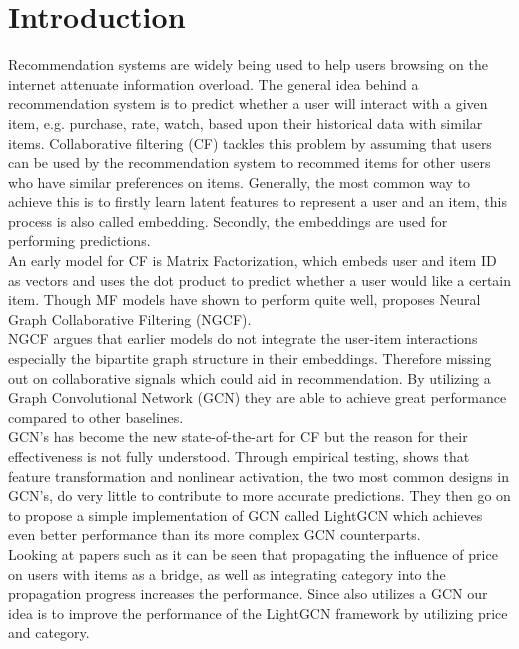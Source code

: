 \section{Introduction}
Recommendation systems are widely being used to help users browsing on the internet attenuate information overload\cite{YT_rec,Pint_rec}.
The general idea behind a recommendation system is to predict whether a user will interact with a given item, e.g. purchase, rate, watch, based upon their historical data with similar items.
Collaborative filtering (CF) tackles this problem by assuming that users can be used by the recommendation system to recommed items for other users who have similar preferences on items.
Generally, the most common way to achieve this is to firstly learn latent features to represent a user and an item, this process is also called embedding.
Secondly, the embeddings are used for performing predictions.
\\
An early model for CF is Matrix Factorization, which embeds user and item ID as vectors and uses the dot product to predict whether a user would like a certain item.
Though MF models have shown to perform quite well, \cite{NGCF_2019} proposes Neural Graph Collaborative Filtering (NGCF).
\\
NGCF argues that earlier models do not integrate the user-item interactions especially the bipartite graph structure in their embeddings.
Therefore missing out on collaborative signals which could aid in recommendation.
By utilizing a Graph Convolutional Network (GCN) they are able to achieve great performance compared to other baselines.
\\
GCN's has become the new state-of-the-art for CF but the reason for their effectiveness is not fully understood\cite{lightgcn}.
Through empirical testing, \cite{lightgcn} shows that feature transformation and nonlinear activation, the two most common designs in GCN's, do very little to contribute to more accurate predictions.
They then go on to propose a simple implementation of GCN called LightGCN which achieves even better performance than its more complex GCN counterparts.
\\
Looking at papers such as \cite{Priceaware} it can be seen that propagating the influence of price on users with items as a bridge, as well as integrating category into the propagation progress increases the performance.
Since \cite{Priceaware} also utilizes a GCN our idea is to improve the performance of the LightGCN framework by utilizing price and category.
